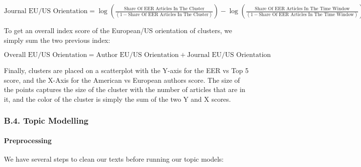 \documentclass[]{elsarticle} %
\begin{document}
\(\text{Journal EU/US Orientation}=\log(\frac{\text{Share Of EER Articles In The Cluster}}{(1-\text{Share Of EER Articles In The Cluster})})-\log(\frac{\text{Share Of EER Articles In The Time Window}}{(1-\text{Share Of EER Articles In The Time Window})})\)\newline

To get an overall index score of the European/US orientation of
clusters, we simply sum the two previous index:\newline

\(\text{Overall EU/US Orientation}=\text{Author EU/US Orientation} + \text{Journal EU/US Orientation}\)\newline

Finally, clusters are placed on a scatterplot with the Y-axis for the
EER vs Top 5 score, and the X-Axis for the American vs European authors
score. The size of the points captures the size of the cluster with the
number of articles that are in it, and the color of the cluster is
simply the sum of the two Y and X scores.

\hypertarget{topic}{%
\subsubsection*{B.4. Topic Modelling}\label{topic}}

\hypertarget{preprocessing}{%
\paragraph*{Preprocessing}\label{preprocessing}}

We have several steps to clean our texts before running our topic
models:
\end{document}
